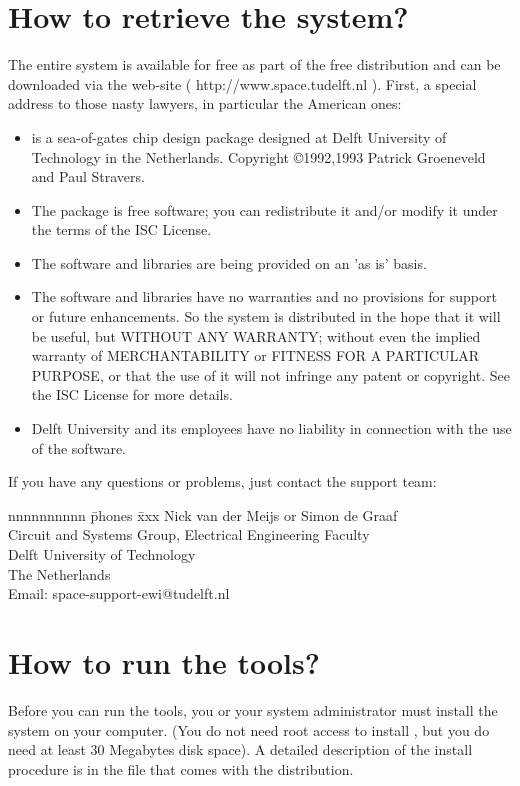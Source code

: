 \section{How to retrieve the \protect{} system?}
The entire  system is available for free as part of the free  distribution and
can be downloaded via the  web-site ( http://www.space.tudelft.nl ).
First, a special address to those nasty lawyers, in particular the
American ones: 
\begin{itemize}
\item
{} is a sea-of-gates chip design package designed at Delft 
University of Technology in the Netherlands. Copyright \copyright 1992,1993
Patrick Groeneveld and Paul Stravers.
\item
The  package is free software; you can redistribute it and/or modify
it under the terms of the ISC License.
\item
The software and libraries are being provided on an 'as is' basis.
\item
The software and libraries have no warranties and no provisions for support or
future enhancements. So the system is distributed in the hope that it will be
useful, but WITHOUT ANY WARRANTY; without even the implied warranty of
MERCHANTABILITY or FITNESS FOR A PARTICULAR PURPOSE, or that the use of it
will not infringe any patent or copyright.  See the ISC License for more details.
\item
Delft University and its employees have no liability in connection with the use
of the software.
\end{itemize}

If you have any questions or problems, just contact the  support team:

\begin{tabbing}
nnnnnnnnnn \= phones \= xxx \kill
\> Nick van der Meijs or Simon de Graaf\\
\> Circuit and Systems Group, Electrical Engineering Faculty\\
\> Delft University of Technology\\
\> The Netherlands\\
\> Email: \> space-support-ewi@tudelft.nl
\end{tabbing}

\section{How to run the \protect{} tools?}
Before you can run the  tools, you or your system administrator must
install the system on your computer. (You do not need root access to install
, but you do need at least 30 Megabytes disk space). A detailed
description of the install procedure is in the file  
that comes with the  distribution. 

